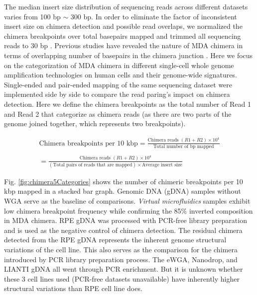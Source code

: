 The median insert size distribution of sequencing reads across different datasets varies from 100 bp $\sim$ 300 bp. In order to eliminate the factor of inconsistent insert size on chimera detection and possible read overlaps, we normalized the chimera breakpoints over total basepairs mapped and trimmed all sequencing reads to 30 bp \cite{Tu:2015dc}. Previous studies have revealed the nature of MDA chimera in terms of overlapping number of basepairs in the chimera junction \cite{Tu:2017fz, Tu:2015dc}. Here we focus on the categorization of MDA chimera in different single-cell whole genome amplification technologies on human cells and their genome-wide signatures. Single-ended and pair-ended mapping of the same sequencing dataset were implemented side by side to compare the read paring's impact on chimera detection. Here we define the chimera breakpoints as the total number of Read 1 and Read 2 that categorize as chimera reads (as there are two parts of the genome joined together, which represents two breakpoints). 

\begin{eqnarray*}
\text{Chimera breakpoints per 10 kbp} = \frac{ \text{Chimera reads } (R1 + R2) \times 10^4}{ \text{Total number of bp mapped}} \\
\\
= \frac{ \text{Chimera reads } (R1 + R2) \times 10^4}{ (\text{Total pairs of reads that are mapped}) \times \text{Average insert size}}
\end{eqnarray*}

Fig. \ref{fig:chimera5Categories} shows the number of chimeric breakpoints per 10 kbp mapped in a stacked bar graph. Genomic DNA (gDNA) samples without WGA serve as the baseline of comparisons. \textit{Virtual microfluidics} samples exhibit low chimera breakpoint frequency while confirming the 85\% inverted composition in MDA chimera. RPE gDNA was processed with PCR-free library preparation and is used as the negative control of chimera detection. The residual chimera detected from the RPE gDNA represents the inherent genome structural variations of the cell line. This also serves as the comparison for the chimera introduced by PCR library preparation process. The eWGA, Nanodrop, and LIANTI gDNA all went through PCR enrichment. But it is unknown whether these 3 cell lines used (PCR-free datasets unavailable) have inherently higher structural variations than RPE cell line does. 

